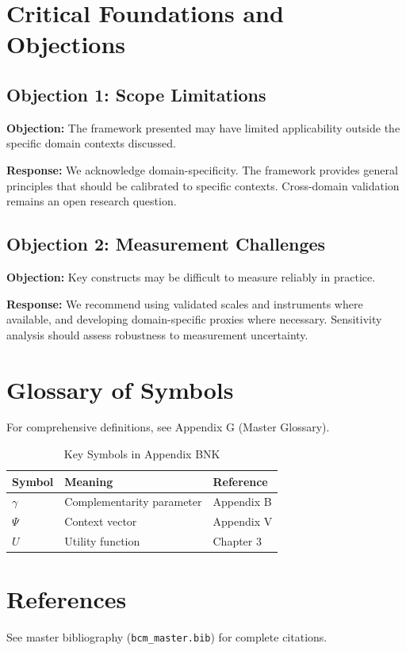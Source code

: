 \documentclass[11pt]{article}
\begin{document}

\section{Critical Foundations and Objections}
\label{sec:bnk-foundations}

\subsection{Objection 1: Scope Limitations}

\textbf{Objection:} The framework presented may have limited applicability
outside the specific domain contexts discussed.

\textbf{Response:} We acknowledge domain-specificity. The framework provides
general principles that should be calibrated to specific contexts. Cross-domain
validation remains an open research question.

\subsection{Objection 2: Measurement Challenges}

\textbf{Objection:} Key constructs may be difficult to measure reliably in
practice.

\textbf{Response:} We recommend using validated scales and instruments where
available, and developing domain-specific proxies where necessary. Sensitivity
analysis should assess robustness to measurement uncertainty.



\section{Glossary of Symbols}
\label{sec:bnk-glossary}

For comprehensive definitions, see Appendix G (Master Glossary).

\begin{table}[htbp]
\centering
\caption{Key Symbols in Appendix BNK}
\begin{tabular}{lll}
\toprule
\textbf{Symbol} & \textbf{Meaning} & \textbf{Reference} \\
\midrule
$\gamma$ & Complementarity parameter & Appendix B \\
$\Psi$ & Context vector & Appendix V \\
$U$ & Utility function & Chapter 3 \\
\bottomrule
\end{tabular}
\end{table}


\section{References}
\label{sec:references}

See master bibliography (\texttt{bcm\_master.bib}) for complete citations.

\nocite{bcm_master}
\end{document}
